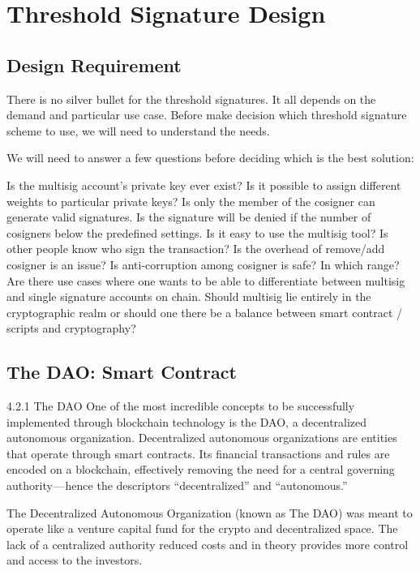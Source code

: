 \section{Threshold Signature Design}
\label{sec:thresholddesign}

\subsection{Design Requirement}
\label{requirement}

There is no silver bullet for the threshold signatures. It all depends on the demand and particular use case. Before make decision which threshold signature scheme to use, we will need to understand the needs. 

We will need to answer a few questions before deciding which is the best solution:

Is the multisig account’s private key ever exist?
Is it possible to assign different weights to particular private keys? 
Is only the member of the cosigner can generate valid signatures.
Is the signature will be denied if the number of cosigners below the predefined settings.
Is it easy to use the multisig tool?
Is other people know who sign the transaction?
Is the overhead of remove/add cosigner is an issue?
Is anti-corruption among cosigner is safe? In which range?
Are there use cases where one wants to be able to differentiate between multisig and single signature accounts on chain.
Should multisig lie entirely in the cryptographic realm or should one there be a balance between smart contract / scripts and cryptography?

\subsection{The DAO: Smart Contract}
\label{thedao}

4.2.1 The DAO
One of the most incredible concepts to be successfully implemented through blockchain technology is the DAO, a decentralized autonomous organization. Decentralized autonomous organizations are entities that operate through smart contracts. Its financial transactions and rules are encoded on a blockchain, effectively removing the need for a central governing authority — hence the descriptors “decentralized” and “autonomous.”

The Decentralized Autonomous Organization (known as The DAO) was meant to operate like a venture capital fund for the crypto and decentralized space. The lack of a centralized authority reduced costs and in theory provides more control and access to the investors.

